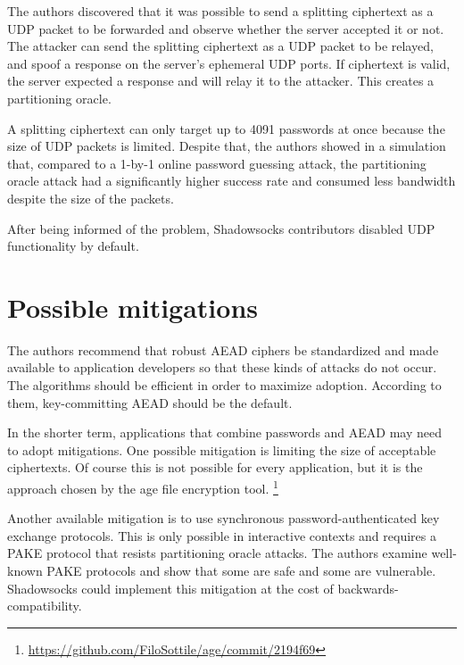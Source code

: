 \documentclass[9pt, a4paper]{article}
\begin{document}
The authors discovered that it was possible to send a splitting ciphertext as a
UDP packet to be forwarded and observe whether the server accepted it or not.
The attacker can send the splitting ciphertext as a UDP packet to be relayed,
and spoof a response on the server's ephemeral UDP ports.
If ciphertext is valid, the server expected a response and will relay it to the attacker.
This creates a partitioning oracle.

A splitting ciphertext can only target up to 4091 passwords at once because the size of UDP packets is limited.
Despite that,
the authors showed in a simulation that,
compared to a 1-by-1 online password guessing attack,
the partitioning oracle attack had a significantly higher success rate and consumed less bandwidth despite the size of the packets.

After being informed of the problem,
Shadowsocks contributors disabled UDP functionality by default.

\section{Possible mitigations}
The authors recommend that robust AEAD ciphers be standardized and made available to application developers so that these kinds of attacks do not occur. The algorithms should be efficient in order to maximize adoption. According to them, key-committing AEAD should be the default.

In the shorter term, applications that combine passwords and AEAD may need to adopt mitigations.
One possible mitigation is
limiting the size of acceptable ciphertexts.
Of course this is not possible for every application,
but it is the approach chosen by the age file encryption tool.
\footnote{\url{https://github.com/FiloSottile/age/commit/2194f69}}

Another available mitigation is
to use synchronous password-authenticated key exchange protocols.
This is only possible in interactive contexts
and requires a PAKE protocol that resists partitioning oracle attacks.
The authors examine well-known PAKE protocols and show that some are safe and some are vulnerable.
Shadowsocks could implement this mitigation at the cost of backwards-compatibility.


\footnotesize 
\end{document}
